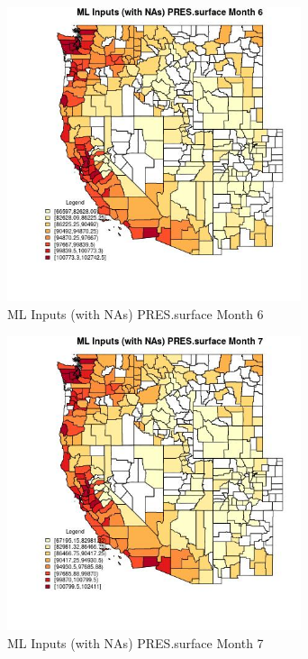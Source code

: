 \begin{figure} 
\centering  
\includegraphics[width=0.77\textwidth]{Code_Outputs/Report_ML_input_PM25_Step4_part_f_de_duplicated_aveswNAs_CountyPRESsurfacemedianMonth6.jpg} 
\caption{\label{fig:Report_ML_input_PM25_Step4_part_f_de_duplicated_aveswNAsCountyPRESsurfacemedianMonth6}ML Inputs (with NAs) PRES.surface Month 6} 
\end{figure} 
 

\clearpage 

\begin{figure} 
\centering  
\includegraphics[width=0.77\textwidth]{Code_Outputs/Report_ML_input_PM25_Step4_part_f_de_duplicated_aveswNAs_CountyPRESsurfacemedianMonth7.jpg} 
\caption{\label{fig:Report_ML_input_PM25_Step4_part_f_de_duplicated_aveswNAsCountyPRESsurfacemedianMonth7}ML Inputs (with NAs) PRES.surface Month 7} 
\end{figure} 
 

